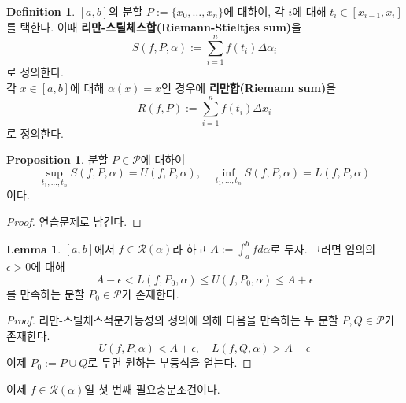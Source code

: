 \documentclass[11pt]{book}
\numberwithin{equation}{chapter}
\def\eps{\epsilon}
\def\calP{\mathcal{P}}
\def\calR{\mathcal{R}}
\theoremstyle{definition}
\newtheorem{lem}[thm]{Lemma}
\newtheorem{prop}[thm]{Proposition}
\newtheorem{defn}[thm]{Definition}
\begin{document}
\begin{defn}
    \([a, b]\)의 분할 \(P := \{x_0, \ldots, x_n\}\)에 대하여, 각 \(i\)에 대해 \(t_i \in [x_{i-1}, x_i]\)를 택한다. 이때 \textbf{리만-스틸체스합(Riemann-Stieltjes sum)}을
    \[
        S(f, P, \alpha) := \sum_{i=1}^n f(t_i)\Delta \alpha_i
    \]
    로 정의한다.\\
    각 \(x \in [a, b]\)에 대해 \(\alpha(x) = x\)인 경우에 \textbf{리만합(Riemann sum)}을
    \[
        R(f, P) := \sum_{i=1}^n f(t_i) \Delta x_i
    \]
    로 정의한다.
\end{defn}

\begin{prop} \label{9.1.10}
    분할 \(P \in \calP\)에 대하여
    \[
        \sup_{t_1, \ldots, t_n} S(f, P, \alpha) = U(f, P, \alpha), \quad \inf_{t_1, \ldots, t_n} S(f, P, \alpha) = L(f, P, \alpha)
    \]
    이다.
\end{prop}
\begin{proof}
    연습문제로 남긴다.
\end{proof}

\begin{lem} \label{9.1.11}
    \([a, b]\)에서 \(f \in \calR(\alpha)\)라 하고 \(\displaystyle A :=\int_a^b f d\alpha\)로 두자. 그러면 임의의 \(\eps > 0\)에 대해
    \begin{equation} \label{eq9.1}
        A - \eps < L(f, P_0, \alpha) \le U(f, P_0, \alpha) \le A + \eps
    \end{equation}
    를 만족하는 분할 \(P_0 \in \calP\)가 존재한다.
\end{lem}
\begin{proof}
    리만-스틸체스적분가능성의 정의에 의해 다음을 만족하는 두 분할 \(P, Q \in \calP\)가 존재한다.
    \[
        U(f, P, \alpha) < A + \eps, \quad L(f, Q, \alpha) > A - \eps
    \]
    이제 \(P_0 := P \cup Q\)로 두면 원하는 부등식을 얻는다.
\end{proof}

이제 \(f \in \calR(\alpha)\)일 첫 번째 필요충분조건이다.
\end{document}
